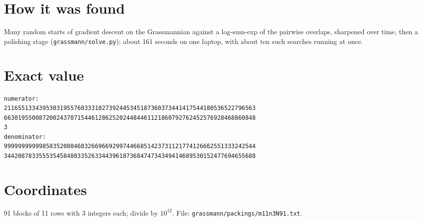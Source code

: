 \documentclass[11pt,a4paper]{article}
\begin{document}
\section{How it was found}
Many random starts of gradient descent on the Grassmannian against a log-sum-exp of the pairwise overlaps, sharpened over time, then a polishing stage (\texttt{grassmann/solve.py}); about 161 seconds on one laptop, with about ten such searches running at once.


\appendix
\section{Exact value}
{\small
\begin{verbatim}
numerator:
211655133439530319557603331027392445345187360373441417544180536522796563
663019550087200243707154461286252024484461121860792762452576928468860848
3
denominator:
999999999998583520804603266966929974466851423731121774126662551333242544
344208783355535458480335263344396187368474734349414689530152477694655688
\end{verbatim}}

\section{Coordinates}
91 blocks of 11 rows with 3 integers each; divide by $10^{12}$. File: \texttt{grassmann/packings/m11n3N91.txt}.
{\tiny
\begin{multicols}{3}
\end{multicols}}
\end{document}
